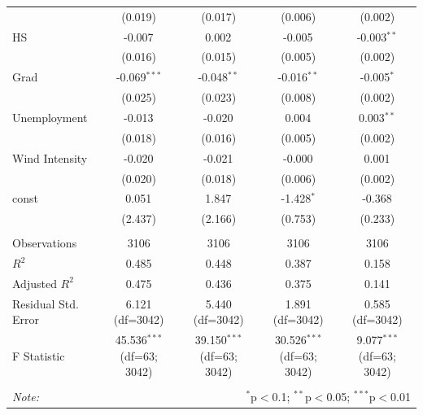 \begin{table}[!htbp]
\begin{tabular}{@{\extracolsep{5pt}}lcccc}
& (0.019) & (0.017) & (0.006) & (0.002) \\
 HS & -0.007$^{}$ & 0.002$^{}$ & -0.005$^{}$ & -0.003$^{**}$ \\
& (0.016) & (0.015) & (0.005) & (0.002) \\
 Grad & -0.069$^{***}$ & -0.048$^{**}$ & -0.016$^{**}$ & -0.005$^{*}$ \\
& (0.025) & (0.023) & (0.008) & (0.002) \\
 Unemployment & -0.013$^{}$ & -0.020$^{}$ & 0.004$^{}$ & 0.003$^{**}$ \\
& (0.018) & (0.016) & (0.005) & (0.002) \\
 Wind Intensity & -0.020$^{}$ & -0.021$^{}$ & -0.000$^{}$ & 0.001$^{}$ \\
& (0.020) & (0.018) & (0.006) & (0.002) \\
 const & 0.051$^{}$ & 1.847$^{}$ & -1.428$^{*}$ & -0.368$^{}$ \\
& (2.437) & (2.166) & (0.753) & (0.233) \\
\hline \\[-1.8ex]
 Observations & 3106 & 3106 & 3106 & 3106 \\
 $R^2$ & 0.485 & 0.448 & 0.387 & 0.158 \\
 Adjusted $R^2$ & 0.475 & 0.436 & 0.375 & 0.141 \\
 Residual Std. Error & 6.121 (df=3042) & 5.440 (df=3042) & 1.891 (df=3042) & 0.585 (df=3042) \\
 F Statistic & 45.536$^{***}$ (df=63; 3042) & 39.150$^{***}$ (df=63; 3042) & 30.526$^{***}$ (df=63; 3042) & 9.077$^{***}$ (df=63; 3042) \\
\hline
\hline \\[-1.8ex]
\textit{Note:} & \multicolumn{4}{r}{$^{*}$p$<$0.1; $^{**}$p$<$0.05; $^{***}$p$<$0.01} \\
\end{tabular}
\end{table}